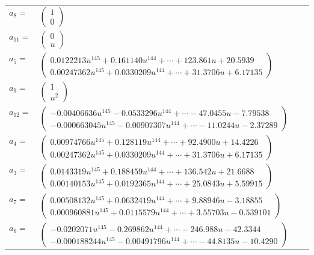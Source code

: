 \documentclass[1p]{elsarticle_modified}
\theoremstyle{definition}
\begin{document}
\begin{tabular}{m{7pt} m{180pt} m{7pt} m{180pt} }
\flushright $a_{8}=$&$\begin{pmatrix}1\\0\end{pmatrix}$ \\
\flushright $a_{11}=$&$\begin{pmatrix}0\\u\end{pmatrix}$ \\
\flushright $a_{5}=$&$\begin{pmatrix}0.0122213 u^{145}+0.161140 u^{144}+\cdots+123.861 u+20.5939\\0.00247362 u^{145}+0.0330209 u^{144}+\cdots+31.3706 u+6.17135\end{pmatrix}$ \\
\flushright $a_{9}=$&$\begin{pmatrix}1\\u^2\end{pmatrix}$ \\
\flushright $a_{12}=$&$\begin{pmatrix}-0.00406636 u^{145}-0.0533296 u^{144}+\cdots-47.0455 u-7.79538\\-0.000663045 u^{145}-0.00907307 u^{144}+\cdots-11.0244 u-2.37289\end{pmatrix}$ \\
\flushright $a_{4}=$&$\begin{pmatrix}0.00974766 u^{145}+0.128119 u^{144}+\cdots+92.4900 u+14.4226\\0.00247362 u^{145}+0.0330209 u^{144}+\cdots+31.3706 u+6.17135\end{pmatrix}$ \\
\flushright $a_{3}=$&$\begin{pmatrix}0.0143319 u^{145}+0.188459 u^{144}+\cdots+136.542 u+21.6688\\0.00140153 u^{145}+0.0192365 u^{144}+\cdots+25.0843 u+5.59915\end{pmatrix}$ \\
\flushright $a_{7}=$&$\begin{pmatrix}0.00508132 u^{145}+0.0632419 u^{144}+\cdots+9.88946 u-3.18855\\0.000960881 u^{145}+0.0115579 u^{144}+\cdots+3.55703 u-0.539101\end{pmatrix}$ \\
\flushright $a_{6}=$&$\begin{pmatrix}-0.0202071 u^{145}-0.269862 u^{144}+\cdots-246.988 u-42.3344\\-0.000188244 u^{145}-0.00491796 u^{144}+\cdots-44.8135 u-10.4290\end{pmatrix}$ \\

\end{tabular}
\end{document}
